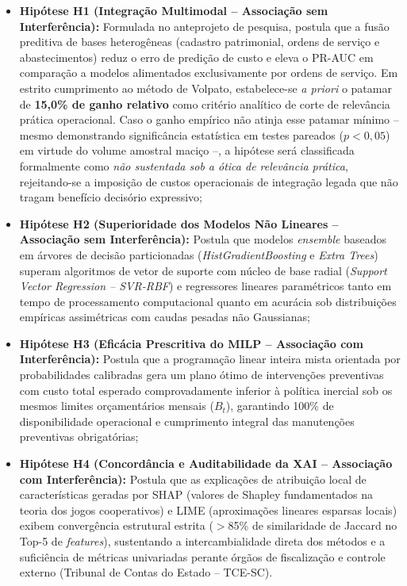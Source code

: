 \begin{itemize}
    \item \textbf{Hipótese H1 (Integração Multimodal -- Associação sem Interferência):} Formulada no anteprojeto de pesquisa, postula que a fusão preditiva de bases heterogêneas (cadastro patrimonial, ordens de serviço e abastecimentos) reduz o erro de predição de custo e eleva o PR-AUC em comparação a modelos alimentados exclusivamente por ordens de serviço. Em estrito cumprimento ao método de Volpato, estabelece-se \textit{a priori} o patamar de \textbf{15,0\% de ganho relativo} como critério analítico de corte de relevância prática operacional. Caso o ganho empírico não atinja esse patamar mínimo -- mesmo demonstrando significância estatística em testes pareados ($p < 0,05$) em virtude do volume amostral maciço --, a hipótese será classificada formalmente como \textit{não sustentada sob a ótica de relevância prática}, rejeitando-se a imposição de custos operacionais de integração legada que não tragam benefício decisório expressivo;
    
    \item \textbf{Hipótese H2 (Superioridade dos Modelos Não Lineares -- Associação sem Interferência):} Postula que modelos \textit{ensemble} baseados em árvores de decisão particionadas (\textit{HistGradientBoosting} e \textit{Extra Trees}) superam algoritmos de vetor de suporte com núcleo de base radial (\textit{Support Vector Regression -- SVR-RBF}) e regressores lineares paramétricos tanto em tempo de processamento computacional quanto em acurácia sob distribuições empíricas assimétricas com caudas pesadas não Gaussianas;
    
    \item \textbf{Hipótese H3 (Eficácia Prescritiva do MILP -- Associação com Interferência):} Postula que a programação linear inteira mista orientada por probabilidades calibradas gera um plano ótimo de intervenções preventivas com custo total esperado comprovadamente inferior à política inercial sob os mesmos limites orçamentários mensais ($B_t$), garantindo 100\% de disponibilidade operacional e cumprimento integral das manutenções preventivas obrigatórias;
    
    \item \textbf{Hipótese H4 (Concordância e Auditabilidade da XAI -- Associação com Interferência):} Postula que as explicações de atribuição local de características geradas por SHAP (valores de Shapley fundamentados na teoria dos jogos cooperativos) e LIME (aproximações lineares esparsas locais) exibem convergência estrutural estrita ($>$85\% de similaridade de Jaccard no Top-5 de \textit{features}), sustentando a intercambialidade direta dos métodos e a suficiência de métricas univariadas perante órgãos de fiscalização e controle externo (Tribunal de Contas do Estado -- TCE-SC).
\end{itemize}
